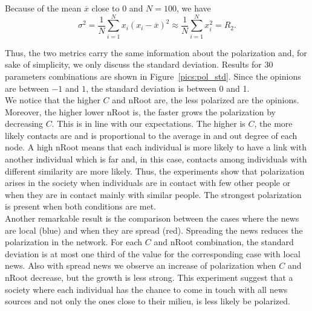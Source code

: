 Because of the mean $\overline{x}$ close to 0 and $N=100$, we have
$$ \sigma^2 = \frac{1}{N} \sum_{i=1}^N x_i (x_i-\overline{x})^2 \approx \frac{1}{N} \sum_{i=1}^N x_i^2 = R_2.$$

Thus, the two metrics carry the same information about the polarization and, for sake of simplicity, we only discuss the standard deviation. Results for 30 parameters combinations are shown in Figure~\ref{pics:pol_std}. Since the opinions are between $-1$ and $1$, the standard deviation is between 0 and 1.\\

We notice that the higher $C$ and nRoot are, the less polarized are the opinions. Moreover, the higher lower nRoot is, the faster grows the polarization by decreasing $C$. This is in line with our expectations. The higher is $C$, the more likely contacts are and is proportional to the average in and out degree of each node. A high nRoot means that each individual is more likely to have a link with another individual which is far and, in this case, contacts among individuals with different similarity are more likely. Thus, the experiments show that polarization arises in the society when individuals are in contact with few other people or when they are in contact mainly with similar people. The strongest polarization is present when both conditions are met.\\

Another remarkable result is the comparison between the cases where the news are local (blue) and when they are spread (red). Spreading the news reduces the polarization in the network. 
For each $C$ and nRoot combination, the standard deviation is at most one third of the value for the corresponding case with local news. Also with spread news we observe an increase of polarization when $C$ and nRoot decrease, but the growth is less strong. This experiment suggest that a society where each individual has the chance to come in touch with all news sources and not only the ones close to their milieu, is less likely be polarized.

